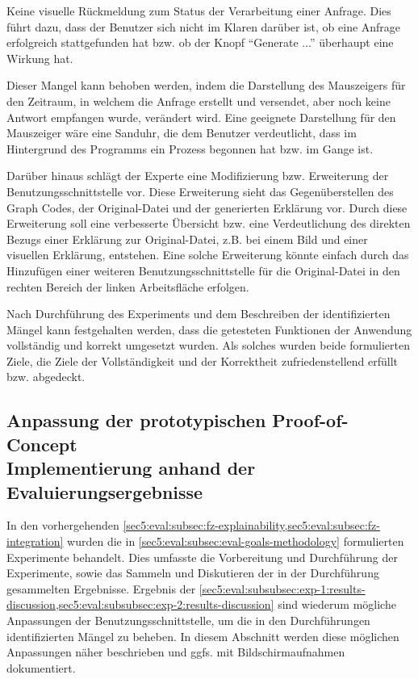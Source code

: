 Keine visuelle Rückmeldung zum Status der Verarbeitung einer Anfrage.
Dies führt dazu, dass der Benutzer sich nicht im Klaren darüber ist, ob eine Anfrage erfolgreich stattgefunden hat bzw. ob der Knopf \enquote{Generate ...} überhaupt eine Wirkung hat.

Dieser Mangel kann behoben werden, indem die Darstellung des Mauszeigers für den Zeitraum, in welchem die Anfrage erstellt und versendet, aber noch keine Antwort empfangen wurde, verändert wird.
Eine geeignete Darstellung für den Mauszeiger wäre eine Sanduhr, die dem Benutzer verdeutlicht, dass im Hintergrund des Programms ein Prozess begonnen hat bzw. im Gange ist.

Darüber hinaus schlägt der Experte eine Modifizierung bzw. Erweiterung der Benutzungsschnittstelle vor.
Diese Erweiterung sieht das Gegenüberstellen des Graph Codes, der Original-Datei und der generierten Erklärung vor.
Durch diese Erweiterung soll eine verbesserte Übersicht bzw. eine Verdeutlichung des direkten Bezugs einer Erklärung zur Original-Datei, z.B. bei einem Bild und einer visuellen Erklärung, entstehen.
Eine solche Erweiterung könnte einfach durch das Hinzufügen einer weiteren Benutzungsschnittstelle für die Original-Datei in den rechten Bereich der linken Arbeitsfläche erfolgen.

Nach Durchführung des Experiments und dem Beschreiben der identifizierten Mängel kann festgehalten werden, dass die getesteten Funktionen der Anwendung vollständig und korrekt umgesetzt wurden.
Als solches wurden beide formulierten Ziele, die Ziele der Vollständigkeit und der Korrektheit zufriedenstellend erfüllt bzw. abgedeckt.

\clearpage

\subsection[Anpassung der prototypischen Proof-of-Concept Implementierung]{\texorpdfstring{Anpassung der prototypischen Proof-of-Concept \\ Implementierung anhand der Evaluierungsergebnisse}{Anpassung der prototypischen Proof-of-Concept Implementierung anhand der Evaluierungsergebnisse}}
\label{sec5:eval:subsec:adaptation}
In den vorhergehenden \cref{sec5:eval:subsec:fz-explainability,sec5:eval:subsec:fz-integration} wurden die in \cref{sec5:eval:subsec:eval-goals-methodology} formulierten Experimente behandelt.
Dies umfasste die Vorbereitung und Durchführung der Experimente, sowie das Sammeln und Diskutieren der in der Durchführung gesammelten Ergebnisse.
Ergebnis der \cref{sec5:eval:subsubsec:exp-1:results-discussion,sec5:eval:subsubsec:exp-2:results-discussion} sind wiederum mögliche Anpassungen der Benutzungsschnittstelle, um die in den Durchführungen identifizierten Mängel zu beheben.
In diesem Abschnitt werden diese möglichen Anpassungen näher beschrieben und ggfs. mit Bildschirmaufnahmen dokumentiert.

